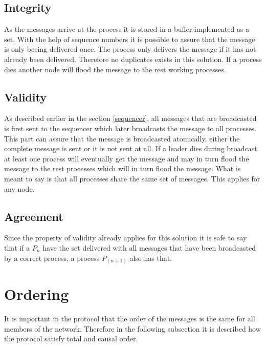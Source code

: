 \documentclass{article}
\begin{document}
\subsection{Integrity}
As the messages arrive at the process it is stored in a buffer implemented as a set. With the help of sequence numbers
it is possible to assure that the message is only beeing delivered once. The process only delivers the message if it
has not already been delivered. Therefore no duplicates exists in this solution. If a process dies another node will flood
the message to the rest working processes.


\subsection{Validity}
As described earlier in the section \ref{sequencer}, all messages that are broadcasted is first sent to the sequencer which
later broadcasts the message to all processes. This part can assure that the message is broadcasted atomically, either the complete
message is sent or it is not sent at all. If a leader dies during broadcast at least one process will eventually get the message and 
may in turn flood the message to the rest processes which will in turn flood the message. What is meant to say is that all processes
share the same set of messages. This applies for any node.


\subsection{Agreement}
Since the property of validity already applies for this solution it is safe to say that if a $P_n$ have the set delivered with all
messages that have been broadcasted by a correct process, a process $P_(n+1)$ also has that.

\section{Ordering}
  It is important in the protocol that the order of the messages is the same 
  for all members of the network. Therefore in the following subsection it is 
  described how the protocol satisfy total and causal order.
\end{document}
